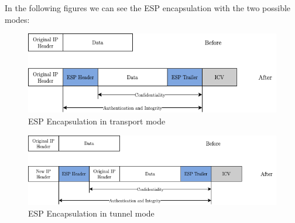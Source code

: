\documentclass[11pt]{book}
\begin{document}
In the following figures we can see the ESP encapsulation with the two possible modes:
\begin{figure}[H]
	\centering
	\includegraphics [scale=0.6] {esp-transport.png}
	\caption{ESP Encapsulation in transport mode}
\end{figure}
\begin{figure}[H]
	\centering
	\includegraphics [scale=0.6] {esp-tunnel.png}
	\caption{ESP Encapsulation in tunnel mode}
\end{figure}
\end{document}

